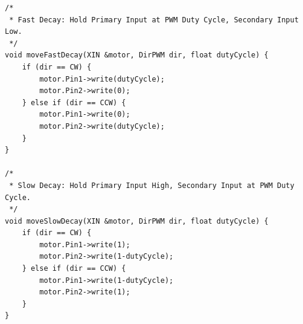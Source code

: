 \documentclass{article}
\begin{document}
\begin{lstlisting}[caption={Source Code : Arduino Motor Driver}, label={lst:arduino_pwm_code}]
/*
 * Fast Decay: Hold Primary Input at PWM Duty Cycle, Secondary Input Low.
 */
void moveFastDecay(XIN &motor, DirPWM dir, float dutyCycle) {
    if (dir == CW) {
        motor.Pin1->write(dutyCycle);
        motor.Pin2->write(0);
    } else if (dir == CCW) {
        motor.Pin1->write(0);
        motor.Pin2->write(dutyCycle);
    }
}

/*
 * Slow Decay: Hold Primary Input High, Secondary Input at PWM Duty Cycle.
 */
void moveSlowDecay(XIN &motor, DirPWM dir, float dutyCycle) {
    if (dir == CW) {
        motor.Pin1->write(1);
        motor.Pin2->write(1-dutyCycle);
    } else if (dir == CCW) {
        motor.Pin1->write(1-dutyCycle);
        motor.Pin2->write(1);
    }
}
\end{lstlisting}
\end{document}
